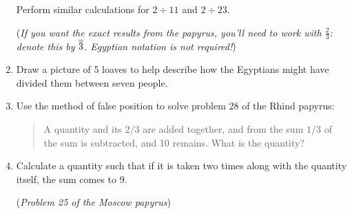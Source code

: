\begin{exercises*}{}{}
\begin{enumerate}
  Perform similar calculations for $2\div 11$ and $2\div 23$.\par
  (\emph{If you want the exact results from the papyrus, you'll need to work with $\frac 23$: denote this by $\overline{\overline{3}}$. Egyptian notation is not required!})
  
  \item Draw a picture of 5 loaves to help describe how the Egyptians might have divided them between seven people.
  
  \item%
  Use the method of false position to solve problem 28 of the Rhind papyrus:
  \begin{quote}
   A quantity and its $2/3$ are added together, and from the sum $1/3$ of the sum is subtracted, and 10 remains. What is the quantity?
  \end{quote}
  
  \item %
  Calculate a quantity such that if it is taken two times along with the quantity itself, the sum comes to 9.\par
  (\emph{Problem 25 of the Moscow papyrus})
\end{enumerate}
\end{exercises*}


